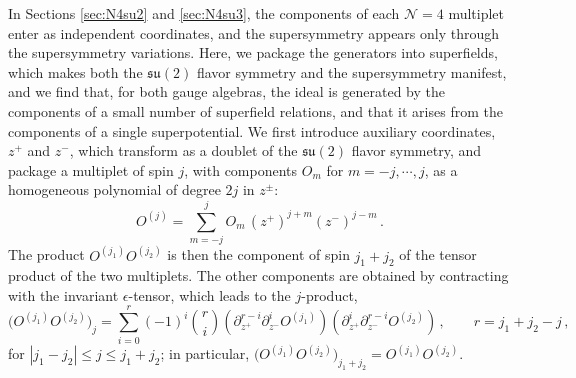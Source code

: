 \documentclass[12pt]{article}
\numberwithin{equation}{section}
\numberwithin{figure}{section}
\theoremstyle{plain}
\theoremstyle{definition}
\begin{document}
In Sections \ref{sec:N4su2} and \ref{sec:N4su3}, the components of each $\mathcal{N}=4$ multiplet enter as independent coordinates, and the supersymmetry appears only through the supersymmetry variations. Here, we package the generators into superfields, which makes both the $\mathfrak{su}(2)$ flavor symmetry and the supersymmetry manifest, and we find that, for both gauge algebras, the ideal is generated by the components of a small number of superfield relations, and that it arises from the components of a single superpotential. We first introduce auxiliary coordinates, $z^+$ and $z^-$, which transform as a doublet of the $\mathfrak{su}(2)$ flavor symmetry, and package a multiplet of spin $j$, with components $O_m$ for $m = -j, \cdots, j$, as a homogeneous polynomial of degree $2j$ in $z^\pm$:
\begin{equation}\label{eqn:N4harmonic}
    O^{(j)} = \sum_{m=-j}^{j} O_m \, (z^+)^{j+m} (z^-)^{j-m} \,.
\end{equation}
The product $O^{(j_1)} O^{(j_2)}$ is then the component of spin $j_1 + j_2$ of the tensor product of the two multiplets. The other components are obtained by contracting with the invariant $\epsilon$-tensor, which leads to the $j$-product,
\begin{equation}\label{eqn:jproduct}
    \big(O^{(j_1)} O^{(j_2)}\big)_j = \sum_{i=0}^{r} (-1)^i \binom{r}{i} \left( \partial_{z^+}^{r-i} \partial_{z^-}^{i} O^{(j_1)} \right) \left( \partial_{z^+}^{i} \partial_{z^-}^{r-i} O^{(j_2)} \right) \,, \qquad r = j_1 + j_2 - j \,,
\end{equation}
for $|j_1 - j_2| \leq j \leq j_1 + j_2$; in particular, $\big(O^{(j_1)} O^{(j_2)}\big)_{j_1 + j_2} = O^{(j_1)} O^{(j_2)}$.
\end{document}
